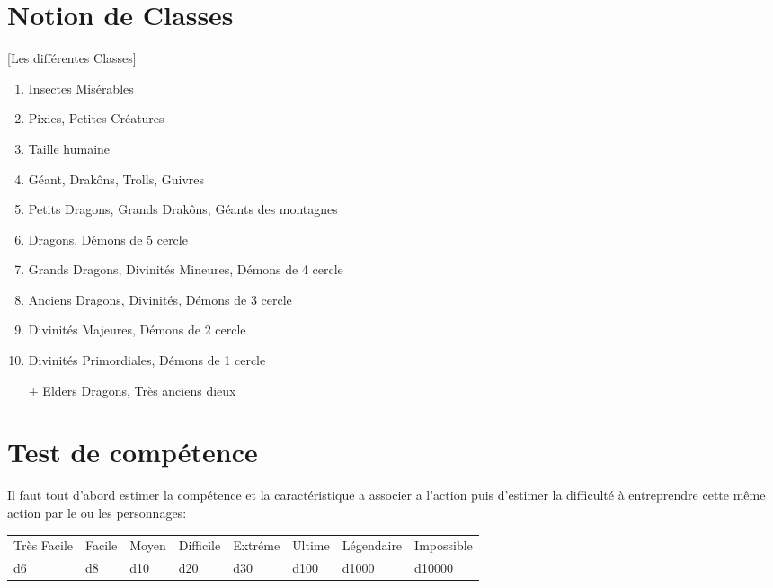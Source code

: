 \section{Notion de Classes}
\label{Classes}[Les différentes Classes]
\begin{enumerate}
    \item Insectes Misérables
    \item Pixies, Petites Créatures
    \item Taille humaine
    \item Géant, Drakôns, Trolls, Guivres
    \item Petits Dragons, Grands Drakôns, Géants des montagnes
    \item Dragons, Démons de 5 cercle
    \item Grands Dragons, Divinités Mineures, Démons de 4 cercle
    \item Anciens Dragons, Divinités, Démons de 3 cercle
    \item Divinités Majeures, Démons de 2 cercle
    \item Divinités Primordiales, Démons de 1 cercle
    \item[+] Elders Dragons, Très anciens dieux
\end{enumerate}

\section{Test de compétence}
Il faut tout d'abord estimer la compétence et la caractéristique a associer a l'action puis d'estimer la difficulté à entreprendre cette même action par le ou les personnages:
\begin{center}
\begin{tabular}{llllllll}
Très Facile & Facile & Moyen & Difficile & Extréme & Ultime & Légendaire & Impossible\\
d6 & d8 & d10 & d20 & d30 & d100 & d1000 & d10000
\end{tabular}
\end{center}

